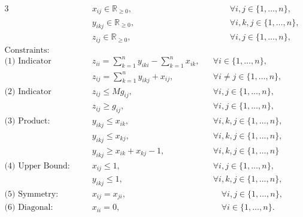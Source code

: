 
\begin{alignat}{3}
& x_{ij} \in  \mathbb{R}_{\geq 0}, 
&&\qquad \forall i,j \in \{1, \dots, n\}, \label{eq::LP_x_variable} \\
& y_{ikj} \in \mathbb{R}_{\geq 0}, 
&&\qquad \forall i,k,j \in \{1, \dots, n\}, \label{eq::LP_y_variable} \\
& z_{ij} \in \mathbb{R}_{\geq 0}, 
&&\qquad \forall i,j \in \{1, \dots, n\}, \label{eq::LP_z_variable} \\
\text{Constraints: } & \nonumber \\
\text{(1) Indicator argument: } 
& z_{ii} = \sum_{k = 1}^{n}y_{iki} - \sum_{k = 1}^{n} x_{ik}, 
&& \forall i \in \{1, \dots, n\} , \label{eq::LP_fund_matrix} \\
& z_{ij} = \sum_{k = 1}^{n}y_{ikj} + x_{ij}, 
&& \forall i \neq j \in \{1, \dots, n\} , \label{eq::LP_indicator_arg} \\
\text{(2) Indicator function: } 
& z_{ij} \leq M g_{ij}, 
&& \forall i, j \in \{1, \dots, n\}, \label{eq::LP_indicator_upper} \\
& z_{ij} \geq g_{ij}, 
&& \forall i, j \in \{1, \dots, n\}, \label{eq::LP_indicator_lower}\\
\text{(3) Product: } 
& y_{ikj} \leq x_{ik}, 
&& \forall i, k, j \in \{1, \dots, n\}, \label{eq::LP_product_upper_first} \\
& y_{ikj} \leq x_{kj}, 
&& \forall i, k, j \in \{1, \dots, n\}, \label{eq::LP_product_upper_second} \\
& y_{ikj} \geq x_{ik} + x_{kj} - 1, 
&& \forall i, k, j \in \{1, \dots, n\} \label{eq::LP_product_lower} \\
\text{(4) Upper Bound: } 
& x_{ij} \leq 1, 
&& \forall i, j \in \{1, \dots, n\}, \label{eq::LP_x_upper_bound} \\
& y_{ikj} \leq 1, 
&& \forall i, k, j \in \{1, \dots, n\}, \label{eq::LP_y_upper_bound} \\
\text{(5) Symmetry: } 
& x_{ij} = x_{ji}, 
&&\quad \forall i,j \in \{1, \dots, n\}, \label{eq::LP_symmetry_x} \\
\text{(6) Diagonal: } 
& x_{ii} = 0, 
&&\quad \forall i \in \{1, \dots, n\}.  \label{eq::LP_diagonal_x} 
\end{alignat} \label{eq::linear_program}